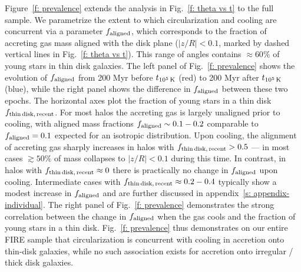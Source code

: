 \documentclass[fleqn,usenatbib]{mnras}
\newcommand{\tcon}{t_{10^5\,{\rm K}}}
\begin{document}
Figure~\ref{f: prevalence} extends the analysis in Fig.~\ref{f: theta vs t} to the full sample.
We parametrize the extent to which circularization and cooling are concurrent via a parameter $f_{\rm aligned}$, which corresponds to the fraction of accreting gas mass aligned with the disk plane ($\vert z/R \vert < 0.1$, marked by dashed vertical lines in Fig.~\ref{f: theta vs t}).
This range of angles contains $\approx 60\%$ of young stars in thin disk galaxies.
The left panel of Fig.~\ref{f: prevalence} shows the evolution of $f_{\rm aligned}$ from 200 Myr before $\tcon$ (red) to 200 Myr after $\tcon$ (blue), while the right panel shows the difference in $f_{\rm aligned}$ between these two epochs.
The horizontal axes plot the fraction of young stars in a thin disk $f_{\rm thin\,disk,\,recent}$. 
For most halos the accreting gas is largely unaligned prior to cooling, with aligned mass fractions $f_{\rm aligned}\sim 0.1 - 0.2$ comparable to $f_{\rm aligned} = 0.1$ expected for an isotropic distribution.
Upon cooling, the alignment of accreting gas sharply increases in halos with $f_{\rm thin\,disk,\,recent} > 0.5$ --- in most cases $\gtrsim 50\%$ of mass collapses to $\vert z/R \vert < 0.1$ during this time.
In contrast, in halos with $f_{\rm thin\,disk,\,recent} \approx 0$ there is practically no change in $f_{\rm aligned}$ upon cooling.
Intermediate cases with $f_{\rm thin\,disk,\,recent} \approx 0.2-0.4$ typically show a modest increase in $f_{\rm aligned}$ and are further discussed in appendix~\ref{s: appendix-individual}.
The right panel of Fig.~\ref{f: prevalence} demonstrates the strong correlation between the change in $f_{\rm aligned}$ when the gas cools and the fraction of young stars in a thin disk. 
Fig.~\ref{f: prevalence} thus demonstrates on our entire FIRE sample that circularization is concurrent with cooling in accretion onto thin-disk galaxies, while no such association exists for accretion onto irregular / thick disk galaxies.
\end{document}
